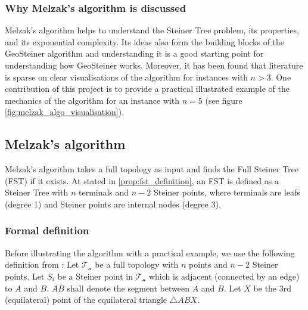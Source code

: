 \documentclass{l4proj}
\begin{document}
\subsubsection{Why Melzak's algorithm is discussed}
Melzak's algorithm helps to understand the Steiner Tree problem, its properties, and its exponential complexity. Its ideas also form the building blocks of the GeoSteiner algorithm and understanding it is a good starting point for understanding how GeoSteiner works. Moreover, it has been found that literature is sparse on clear visualisations of the algorithm for instances with $n>3$. One contribution of this project is to provide a practical illustrated example of the mechanics of the algorithm for an instance with $n=5$ (see figure \ref{fig:melzak_algo_visualisation}).

\subsection{Melzak's algorithm}
\label{sec:melzak_algo}
Melzak's algorithm takes a full topology as input and finds the Full Steiner Tree (FST) if it exists. At stated in \ref{prop:fst_definition}, an FST is defined as a Steiner Tree with $n$ terminals and $n-2$ Steiner points, where terminals are leafs (degree 1) and Steiner points are internal nodes (degree 3).

\subsubsection{Formal definition}
Before illustrating the algorithm with a practical example, we use the following definition from \cite{Brazil2015}:
Let $\mathcal{T_n}$ be a full topology with $n$ points and $n - 2$ Steiner points. Let $S_i$ be a Steiner point in $\mathcal{T_n}$ which is adjacent (connected by an edge) to $A$ and $B$. $\overline{AB}$ shall denote the segment between $A$ and $B$. Let $X$ be the 3rd (equilateral) point of the equilateral triangle $\triangle ABX$.
\end{document}
